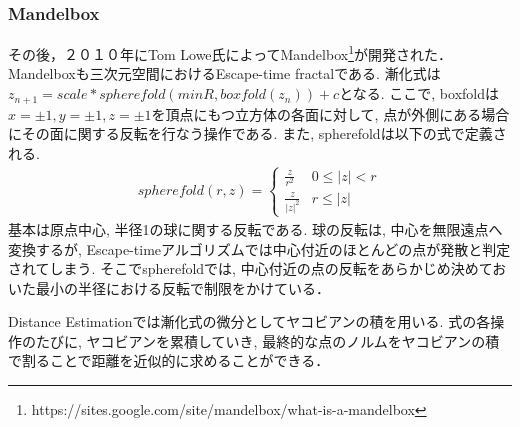 \subsubsection{Mandelbox}
その後，２０１０年にTom Lowe氏によってMandelbox\footnote{https://sites.google.com/site/mandelbox/what-is-a-mandelbox}が開発された．
Mandelboxも三次元空間におけるEscape-time fractalである. 
漸化式は$z_{n+1} = scale * spherefold(minR, boxfold(z_n)) + c$となる.
ここで, boxfoldは$x=\pm1, y=\pm1, z=\pm1$を頂点にもつ立方体の各面に対して, 点が外側にある場合にその面に関する反転を行なう操作である.
また, spherefoldは以下の式で定義される.
\begin{eqnarray*}
 spherefold(r, z) = \begin{cases}
                  \frac{z}{r^2} & 0 \le |z| < r \\
                  \frac{z}{|z|^2} & r \le |z|
                 \end{cases}
\end{eqnarray*}
基本は原点中心, 半径1の球に関する反転である. 
球の反転は, 中心を無限遠点へ変換するが, Escape-timeアルゴリズムでは中心付近のほとんどの点が発散と判定されてしまう. 
そこでspherefoldでは, 中心付近の点の反転をあらかじめ決めておいた最小の半径における反転で制限をかけている．

Distance Estimationでは漸化式の微分としてヤコビアンの積を用いる. 
式の各操作のたびに, ヤコビアンを累積していき, 
最終的な点のノルムをヤコビアンの積で割ることで距離を近似的に求めることができる．

